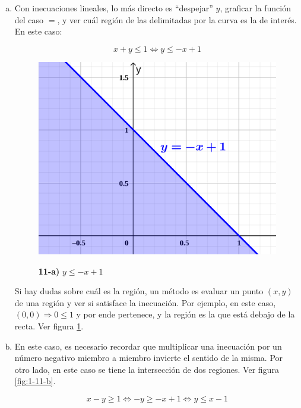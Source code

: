 \documentclass{article}
\begin{document}
\begin{enumerate}[(a)]
\item Con inecuaciones lineales, lo más directo es ``despejar'' $y$, graficar la función del caso $=$, y ver cuál región de las delimitadas por la curva es la de interés. En este caso:

\begin{equation}
x + y \leq 1 \Leftrightarrow y \leq -x + 1
\end{equation}

\begin{figure}[ht]
\caption{\textbf{11-a)} $y \leq -x + 1$}
\includegraphics[scale=2.75]{img/ejercicios/1/11-a.png} 
\centering
\label{fig:1-11-a}
\end{figure}

Si hay dudas sobre cuál es la región, un método es evaluar un punto $(x,y)$ de una región y ver si satisface la inecuación. Por ejemplo, en este caso, $(0,0) \Rightarrow 0 \leq 1$ y por ende pertenece, y la región es la que está debajo de la recta. Ver figura \ref{fig:1-11-a}.

\item En este caso, es necesario recordar que multiplicar una inecuación por un número negativo miembro a miembro invierte el sentido de la misma. Por otro lado, en este caso se tiene la intersección de dos regiones. Ver figura \ref{fig:1-11-b}.

\begin{equation}
x - y \geq 1 \Leftrightarrow -y \geq -x + 1 \Leftrightarrow y \leq x - 1
\end{equation}


\end{enumerate}
\end{document}

